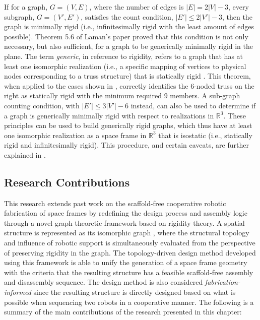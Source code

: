     If for a graph, $G = (V,E)$, where the number of edges is $|E| = 2|V| - 3$, every subgraph, $G = (V',E')$, satisfies the count condition, $|E'| \le 2|V'| - 3$, then the graph is minimally rigid (i.e., infinitesimally rigid with the least amount of edges possible). Theorem 5.6 of Laman’s paper \citep{laman_graphs_1970} proved that this condition is not only necessary, but also sufficient, for a graph to be generically minimally rigid in the plane. The term \textit{generic}, in reference to rigidity, refers to a graph that has at least one isomorphic realization (i.e., a specific mapping of vertices to physical nodes corresponding to a truss structure) that is statically rigid \citep{tay_generating_1985}. This theorem, when applied to the cases shown in , correctly identifies the 6-noded truss on the right as statically rigid with the minimum required 9 members. A sub-graph counting condition, with $|E'| \le 3|V'| - 6$ instead, can also be used to determine if a graph is generically minimally rigid with respect to realizations in $\mathbb{R}^3$. These principles can be used to build generically rigid graphs, which thus have at least one isomorphic realization as a space frame in $\mathbb{R}^3$ that is isostatic (i.e., statically rigid and infinitesimally rigid). This procedure, and certain caveats, are further explained in .
    

\subsection{Research Contributions} \label{sec:2__contribution}
    This research extends past work on the scaffold-free cooperative robotic fabrication of space frames \citep{parascho_cooperative_2019} by redefining the design process and assembly logic through a novel graph theoretic framework based on rigidity theory. A spatial structure is represented as its isomorphic graph \citep{shai_isomorphic_1999}, where the structural topology and influence of robotic support is simultaneously evaluated from the perspective of preserving rigidity in the graph. The topology-driven design method developed using this framework is able to unify the generation of a space frame geometry with the criteria that the resulting structure has a feasible scaffold-free assembly and disassembly sequence. The design method is also considered \textit{fabrication-informed} since the resulting structure is directly designed based on what is possible when sequencing two robots in a cooperative manner. The following is a summary of the main contributions of the research presented in this chapter:
    
